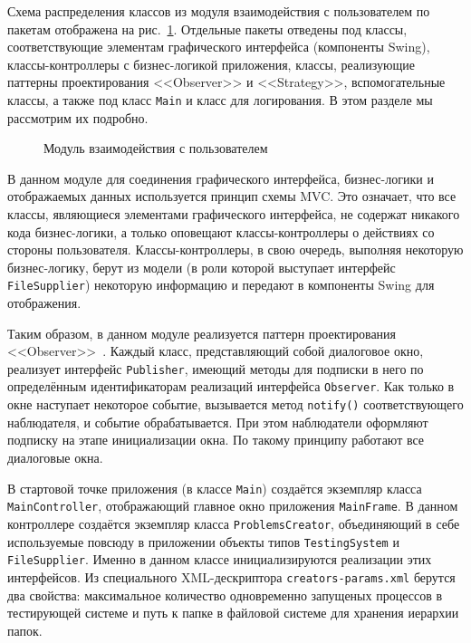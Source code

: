 Схема распределения классов из модуля взаимодействия с пользователем по пакетам отображена на рис.~\ref{package_diagram_interaction}. Отдельные пакеты отведены под классы, соответствующие элементам графического интерфейса (компоненты Swing), классы-контроллеры с бизнес-логикой приложения, классы, реализующие паттерны проектирования <<Observer>> и <<Strategy>>, вспомогательные классы, а также под класс \texttt{Main} и класс для логирования. В этом разделе мы рассмотрим их подробно.

\begin{figure}[h]
\caption{Модуль взаимодействия с пользователем}
\label{package_diagram_interaction}
\end{figure}

В данном модуле для соединения графического интерфейса, бизнес-логики и отображаемых данных используется принцип схемы MVC. Это означает, что все классы, являющиеся элементами графического интерфейса, не содержат никакого кода бизнес-логики, а только оповещают классы-контроллеры о действиях со стороны пользователя. Классы-контроллеры, в свою очередь, выполняя некоторую бизнес-логику, берут из модели (в роли которой выступает интерфейс \texttt{File\-Supplier}) некоторую информацию и передают в компоненты Swing для отображения.

Таким образом, в данном модуле реализуется паттерн проектирования <<Ob\-ser\-ver>>~\cite{gamma}. Каждый класс, представляющий собой диалоговое окно, реализует интерфейс \texttt{Publisher}, имеющий методы для подписки в него по определённым идентификаторам реализаций интерфейса \texttt{Observer}. Как только в окне наступает некоторое событие, вызывается метод \texttt{notify()} соответствующего наблюдателя, и событие обрабатывается. При этом наблюдатели оформляют подписку на этапе инициализации окна. По такому принципу работают все диалоговые окна.

В стартовой точке приложения (в классе \texttt{Main}) создаётся экземпляр класса \texttt{Main\-Controller}, отображающий главное окно приложения \texttt{Main\-Frame}. В данном контроллере создаётся экземпляр класса \texttt{Problems\-Creator}, объединяющий в себе используемые повсюду в приложении объекты типов \texttt{Testing\-System} и \texttt{File\-Supplier}. Именно в данном классе инициализируются реализации этих интерфейсов. Из специального XML-дескриптора \texttt{creators-pa\-rams.xml} берутся два свойства: максимальное количество одновременно запущеных процессов в тестирующей системе и путь к папке в файловой системе для хранения иерархии папок.

